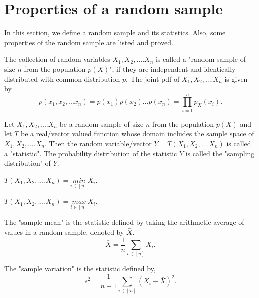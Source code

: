 \documentclass[a4paper,english,12pt]{article}
\begin{document}
\section{Properties of a random sample}
In this section, we define a random sample and its statistics. Also, some properties of the random sample are listed and proved.

\begin{defn}
The collection of random variables $X_1, X_2, .... X_n$ is called a "random sample of size $n$ from the population $p(X)$", if they are independent and identically distributed with common distribution $p$.
The joint pdf of $X_1, X_2, .... X_n$ is given by 
\begin{equation}
p(x_1,x_2,...x_n) = p(x_1) p(x_2)...p(x_n) = \prod\limits_{i=1}^{n} p_X(x_i).
\end{equation} 
\end{defn}

\begin{defn}
Let $X_1, X_2, .... X_n$ be a random sample of size $n$ from the population $p(X)$ and let $T$ be a real/vector valued function whose domain includes the sample space of $X_1, X_2, .... X_n$. Then the random variable/vector $Y = T(X_1, X_2, .... X_n)$ is called a "statistic". The probability distribution of the statistic $Y$ is called the "sampling distribution" of $Y$.
\end{defn}

\begin{exmp}
$T(X_1, X_2, .... X_n) = \underset{i \in [n]}{min} X_i$.
\end{exmp}
\begin{exmp}
$T(X_1, X_2, .... X_n) = \underset{i \in [n]}{max} X_i$.
\end{exmp}

\begin{defn}
The "sample mean" is the statistic defined by taking the arithmetic average of values in a random sample, denoted by $\bar{X}$.
\begin{equation}
\bar{X} = \frac{1}{n} \underset{i \in [n]}{\sum} X_i.
\end{equation}
\end{defn}

\begin{defn}
The "sample variation" is the statistic defined by, 
\begin{equation}
s^2 = \frac{1}{n-1}  \underset{i \in [n]}{\sum} (X_i - \bar{X})^2.
\end{equation}
\end{defn}
\end{document}
